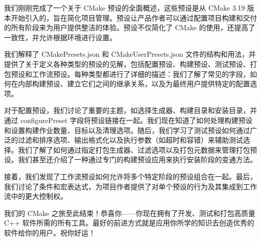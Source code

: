 我们刚刚完成了一个关于 CMake 预设的全面概述，这些预设是从 CMake 3.19 版本开始引入的，旨在简化项目管理。预设让产品作者可以通过配置项目构建和交付的所有阶段来为用户提供整洁的体验。预设不仅简化了 CMake 的使用，还提高了一致性，并允许根据环境进行设置。

我们解释了 CMakePresets.json 和 CMakeUserPresets.json 文件的结构和用法，并提供了关于定义各种类型的预设的见解，包括配置预设、构建预设、测试预设、打包预设和工作流预设。每种类型都进行了详细的描述：我们了解了常见的字段，如何在内部构建预设、建立它们之间的继承关系，以及为最终用户提供特定的配置选项。

对于配置预设，我们讨论了重要的主题，如选择生成器、构建目录和安装目录，并通过 configurePreset 字段将预设链接在一起。我们现在知道了如何处理构建预设和设置构建作业数量、目标以及清理选项。随后，我们学习了测试预设如何通过广泛的过滤和排序选项、输出格式化以及执行参数（如超时和容错）来辅助测试选择。我们了解了如何通过指定打包生成器、过滤选项以及打包元数据来管理打包预设。我们甚至还介绍了一种通过专门的构建预设应用来执行安装阶段的变通方法。

接着，我们发现了工作流预设如何允许将多个特定阶段的预设组合在一起。最后，我们讨论了条件和宏表达式，为项目作者提供了对单个预设的行为及其集成到工作流中的更大控制权。

我们的 CMake 之旅至此结束！恭喜你——你现在拥有了开发、测试和打包高质量 C++ 软件所需的所有工具。最好的前进方式就是应用你所学的知识去创造优秀的软件给你的用户。祝你好运！